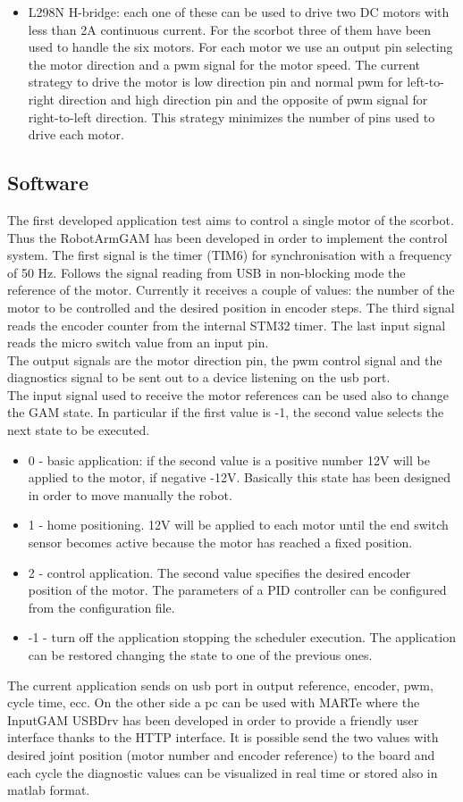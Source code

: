 \begin{itemize}
\item L298N H-bridge: each one of these can be used to drive two DC motors with less than 2A continuous current. For the scorbot three of them have been used to handle the six motors. For each motor we use an output pin selecting the motor direction and a pwm signal for the motor speed. The current strategy to drive the motor is low direction pin and normal pwm for left-to-right direction and high direction pin and the opposite of pwm signal for right-to-left direction. This strategy minimizes the number of pins used to drive each motor. 
 \end{itemize}
 
\subsection{Software}
 The first developed application test aims to control a single motor of the scorbot. Thus the RobotArmGAM has been developed in order to implement the control system. The first signal is the timer (TIM6) for synchronisation with a frequency of 50 Hz. Follows the signal reading from USB in non-blocking mode the reference of the motor. Currently it receives a couple of values: the number of the motor to be controlled and the desired position in encoder steps. The third signal reads the encoder counter from the internal STM32 timer. The last input signal reads the micro switch value from an input pin.\\
 The output signals are the motor direction pin, the pwm control signal and the diagnostics signal to be sent out to a device listening on the usb port.\\
 The input signal used to receive the motor references can be used also to change the GAM state. In particular if the first value is -1, the second value selects the next state to be executed.
 \begin{itemize}
 \item 0 - basic application: if the second value is a positive number 12V will be applied to the motor, if negative -12V. Basically this state has been designed in order to move manually the robot.
 \item 1 - home positioning. 12V will be applied to each motor until the end switch sensor becomes active because the motor has reached a fixed position.
 \item 2 - control application. The second value specifies the desired encoder position of the motor. The parameters of a PID controller can be configured from the configuration file.
 \item -1 - turn off the application stopping the scheduler execution. The application can be restored changing the state to one of the previous ones.
 \end{itemize}
 The current application sends on usb port in output reference, encoder, pwm, cycle time, ecc. On the other side a pc can be used with MARTe where the InputGAM USBDrv has been developed in order to provide a friendly user interface thanks to the HTTP interface. It is possible send the two values with desired joint position (motor number and encoder reference) to the board and each cycle the diagnostic values can be visualized in real time or stored also in matlab format.
 
